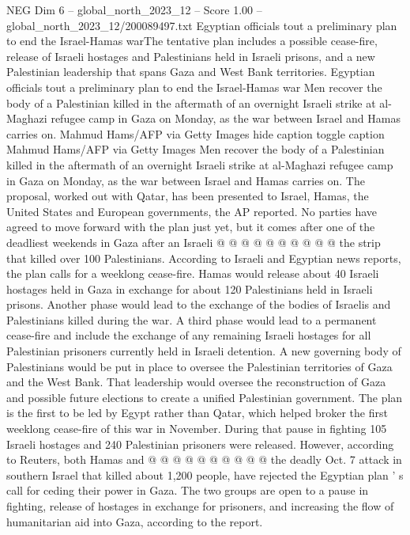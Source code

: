 \begin{textsample}{NEG Dim 6 – global\_north\_2023\_12 – Score 1.00 – global\_north\_2023\_12/200089497.txt}  \label{ex:f6_neg_263}
Egyptian officials tout a preliminary plan to end the Israel-Hamas warThe tentative plan includes a possible cease-fire, release of Israeli hostages and Palestinians held in Israeli prisons, and a new Palestinian leadership that spans Gaza and West Bank territories.
Egyptian officials tout a preliminary plan to end the Israel-Hamas war Men recover the body of a Palestinian killed in the aftermath of an overnight Israeli strike at al-Maghazi refugee camp in Gaza on Monday, as the war between Israel and Hamas carries on.
Mahmud Hams/AFP via Getty Images hide caption toggle caption Mahmud Hams/AFP via Getty Images Men recover the body of a Palestinian killed in the aftermath of an overnight Israeli strike at al-Maghazi refugee camp in Gaza on Monday, as the war between Israel and Hamas carries on.
The proposal, worked out with Qatar, has been presented to Israel, Hamas, the United States and European governments, the AP reported.
No parties have agreed to move forward with the plan just yet, but it comes after one of the deadliest weekends in Gaza after an Israeli @ @ @ @ @ @ @ @ @ @ the strip that killed over 100 Palestinians.
According to Israeli and Egyptian news reports, the plan calls for a weeklong cease-fire.
Hamas would release about 40 Israeli hostages held in Gaza in exchange for about 120 Palestinians held in Israeli prisons.
Another phase would lead to the exchange of the bodies of Israelis and Palestinians killed during the war.
A third phase would lead to a permanent cease-fire and include the exchange of any remaining Israeli hostages for all Palestinian prisoners currently held in Israeli detention.
A new governing body of Palestinians would be put in place to oversee the Palestinian territories of Gaza and the West Bank.
That leadership would oversee the reconstruction of Gaza and possible future elections to create a unified Palestinian government.
The plan is the first to be led by Egypt rather than Qatar, which helped broker the first weeklong cease-fire of this war in November.
During that pause in fighting 105 Israeli hostages and 240 Palestinian prisoners were released.
However, according to Reuters, both Hamas and @ @ @ @ @ @ @ @ @ @ the deadly Oct. 7 attack in southern Israel that killed about 1,200 people, have rejected the Egyptian plan ' s call for ceding their power in Gaza.
The two groups are open to a pause in fighting, release of hostages in exchange for prisoners, and increasing the flow of humanitarian aid into Gaza, according to the report.

\end{textsample}
